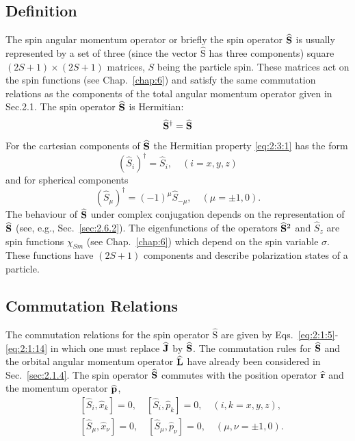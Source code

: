 \subsection{Definition}
The spin angular momentum operator or briefly the spin operator $\widehat{\mathbf{S}}$ is usually represented by a set of three (since the vector $\widehat{\mathrm{S}}$ has three components) square $(2 S+1) \times(2 S+1)$ matrices, $S$ being the particle spin. These matrices act on the spin functions (see Chap.~\ref{chap:6}) and satisfy the same commutation relations as the components of the total angular momentum operator given in Sec.2.1. The spin operator $\widehat{\mathbf{S}}$ is Hermitian:
\begin{equation}
\widehat{\mathbf{S}}^{\dagger}=\widehat{\mathbf{S}} \label{eq:2:3:1}
\end{equation}
For the cartesian components of $\widehat{\mathbf{S}}$ the Hermitian property \eqref{eq:2:3:1} has the form
\begin{equation}
\left(\widehat{S}_{i}\right)^{\dagger}=\widehat{S}_{i}, \quad(i=x, y, z) \label{eq:2:3:2}
\end{equation}
and for spherical components
\begin{equation}
\left(\widehat{S}_{\mu}\right)^{\dagger}=(-1)^{\mu} \widehat{S}_{-\mu}, \quad(\mu= \pm 1,0) .\label{eq:2:3:3}
\end{equation}
The behaviour of $\widehat{\mathbf{S}}$ under complex conjugation depends on the representation of $\widehat{\mathbf{S}}$ (see, e.g., Sec.~\ref{sec:2.6.2}). The eigenfunctions of the operators $\widehat{\mathbf{S}}^{2}$ and $\widehat{S}_{z}$ are spin functions $\chi_{S m}$ (see Chap.~\ref{chap:6}) which depend on the spin variable $\sigma$. These functions have $(2 S+1)$ components and describe polarization states of a particle.

\subsection{Commutation Relations}
The commutation relations for the spin operator $\widehat{\mathrm{S}}$ are given by Eqs.~\eqref{eq:2:1:5}-\eqref{eq:2:1:14} in which one must replace $\widehat{\mathbf{J}}$ by $\widehat{\mathbf{S}}$. The commutation rules for $\widehat{\mathbf{S}}$ and the orbital angular momentum operator $\widehat{\mathbf{L}}$ have already been considered in Sec.~\ref{sec:2.1.4}. The spin operator $\widehat{\mathbf{S}}$ commutes with the position operator $\widehat{\mathbf{r}}$ and the momentum operator $\widehat{\mathbf{p}}$,
\begin{align}
& {\left[\widehat{S}_{i}, \widehat{x}_{k}\right]=0, \quad\left[\widehat{S}_{i}, \widehat{p}_{k}\right]=0, \quad(i, k=x, y, z),}  \label{eq:2:3:4}\\
& {\left[\widehat{S}_{\mu}, \widehat{x}_{\nu}\right]=0, \quad\left[\widehat{S}_{\mu}, \widehat{p}_{\nu}\right]=0, \quad(\mu, \nu= \pm 1,0) .} \label{eq:2:3:5}
\end{align}
